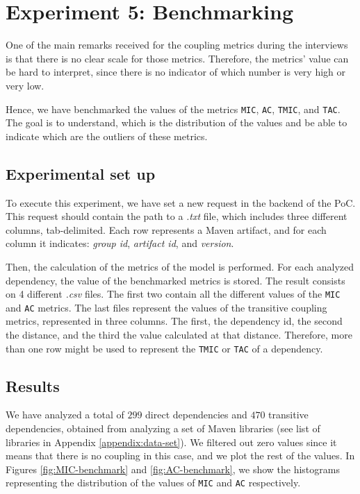 \section{Experiment 5: Benchmarking}
One of the main remarks received for the coupling metrics during the interviews is that there is no clear scale for those metrics. Therefore, the metrics' value can be hard to interpret, since there is no indicator of which number is very high or very low.

Hence, we have benchmarked the values of the metrics \texttt{MIC}, \texttt{AC}, \texttt{TMIC}, and \texttt{TAC}. The goal is to understand, which is the distribution of the values and be able to indicate which are the outliers of these metrics.

\subsection{Experimental set up}
To execute this experiment, we have set a new request in the backend of the PoC. This request should contain the path to a \textit{.txt} file, which includes three different columns, tab-delimited. Each row represents a Maven artifact, and for each column it indicates: \textit{group id}, \textit{artifact id}, and \textit{version}.

Then, the calculation of the metrics of the model is performed. For each analyzed dependency, the value of the benchmarked metrics is stored. The result consists on 4 different \textit{.csv} files. The first two contain all the different values of the \texttt{MIC} and \texttt{AC} metrics. The last files represent the values of the transitive coupling metrics, represented in three columns. The first, the dependency id, the second the distance, and the third the value calculated at that distance. Therefore, more than one row might be used to represent the \texttt{TMIC} or \texttt{TAC} of a dependency.

\subsection{Results}

We have analyzed a total of $299$ direct dependencies and $470$ transitive dependencies, obtained from analyzing a set of Maven libraries (see list of libraries in Appendix \ref{appendix:data-set}). We filtered out zero values since it means that there is no coupling in this case, and we plot the rest of the values. In Figures \ref{fig:MIC-benchmark} and \ref{fig:AC-benchmark}, we show the histograms representing the distribution of the values of \texttt{MIC} and \texttt{AC} respectively.

